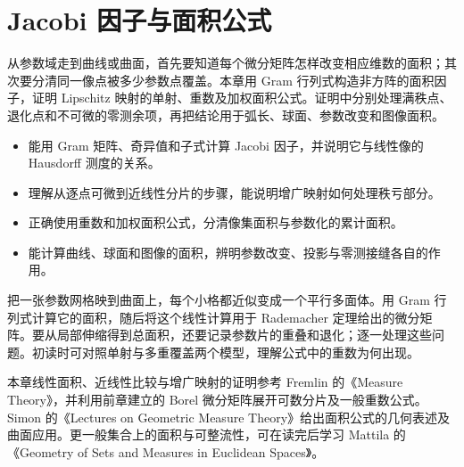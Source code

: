 \chapter{Jacobi 因子与面积公式}
\label{b1:ch:17}
\begin{chapterabstract}
从参数域走到曲线或曲面，首先要知道每个微分矩阵怎样改变相应维数的面积；其次要分清同一像点被多少参数点覆盖。本章用 Gram 行列式构造非方阵的面积因子，证明 Lipschitz 映射的单射、重数及加权面积公式。证明中分别处理满秩点、退化点和不可微的零测余项，再把结论用于弧长、球面、参数改变和图像面积。
\end{chapterabstract}

\begin{learninggoals}
\begin{itemize}
\item\label{b1:item:ch17-goal-linear}能用 Gram 矩阵、奇异值和子式计算 Jacobi 因子，并说明它与线性像的 Hausdorff 测度的关系。
\item\label{b1:item:ch17-goal-proof}理解从逐点可微到近线性分片的步骤，能说明增广映射如何处理秩亏部分。
\item\label{b1:item:ch17-goal-multiplicity}正确使用重数和加权面积公式，分清像集面积与参数化的累计面积。
\item\label{b1:item:ch17-goal-applications}能计算曲线、球面和图像的面积，辨明参数改变、投影与零测接缝各自的作用。
\end{itemize}
\end{learninggoals}

把一张参数网格映到曲面上，每个小格都近似变成一个平行多面体。用 Gram 行列式计算它的面积，随后将这个线性计算用于 Rademacher 定理给出的微分矩阵。要从局部伸缩得到总面积，还要记录参数片的重叠和退化；逐一处理这些问题。初读时可对照单射与多重覆盖两个模型，理解公式中的重数为何出现。

\ProseParagraphBreak

本章线性面积、近线性比较与增广映射的证明参考 Fremlin 的《Measure Theory》\cite[\S265]{Fremlin2016Measure}，并利用前章建立的 Borel 微分矩阵展开可数分片及一般重数公式。Simon 的《Lectures on Geometric Measure Theory》\cite[\S8]{Simon1983Lectures}给出面积公式的几何表述及曲面应用。更一般集合上的面积与可整流性，可在读完后学习 Mattila 的《Geometry of Sets and Measures in Euclidean Spaces》\cite{Mattila1995Geometry}。

